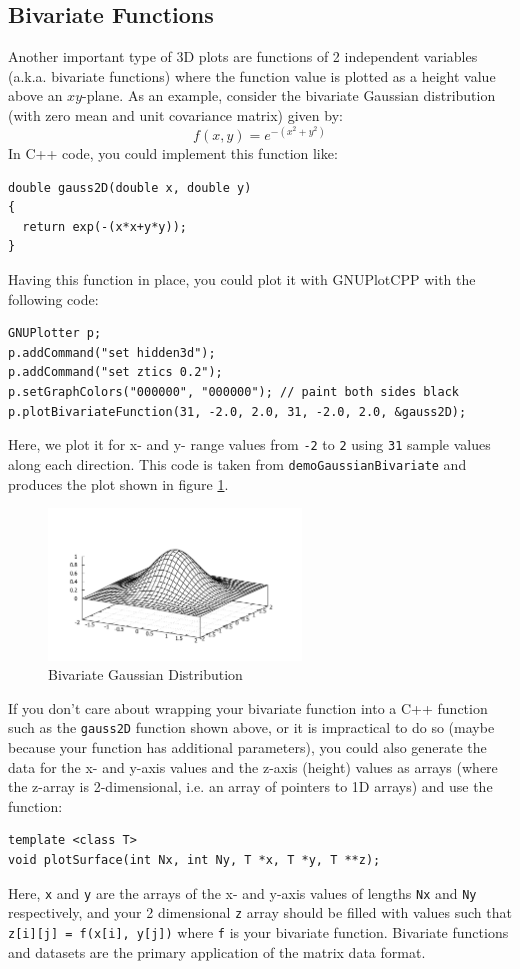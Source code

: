 \documentclass[11pt]{article}
\begin{document}
\subsection{Bivariate Functions}
Another important type of 3D plots are functions of 2 independent variables (a.k.a. bivariate functions) where the function value is plotted as a height value above an $xy$-plane. As an example, consider the bivariate Gaussian distribution (with zero mean and unit covariance matrix) given by:
\begin{equation}
	f(x,y) = e^{-(x^2+y^2)}
\end{equation}
In C++ code, you could implement this function like:
\begin{verbatim}
double gauss2D(double x, double y)
{
  return exp(-(x*x+y*y)); 
}
\end{verbatim}
Having this function in place, you could plot it with GNUPlotCPP with the following code:
\begin{verbatim}
GNUPlotter p;
p.addCommand("set hidden3d");
p.addCommand("set ztics 0.2");
p.setGraphColors("000000", "000000"); // paint both sides black
p.plotBivariateFunction(31, -2.0, 2.0, 31, -2.0, 2.0, &gauss2D);
\end{verbatim}
Here, we plot it for x- and y- range values from \texttt{-2} to \texttt{2} using \texttt{31} sample values along each direction. This code is taken from \texttt{demoGaussianBivariate} and produces the plot shown in figure \ref{fig:GaussianBivariate}.
\begin{figure}[h!]
	\centering
  	\includegraphics[width=0.60\textwidth]{Plots/GaussianBivariate.pdf}
	\caption{Bivariate Gaussian Distribution}
	\label{fig:GaussianBivariate}
\end{figure}
If you don't care about wrapping your bivariate function into a C++ function such as the \texttt{gauss2D} function shown above, or it is impractical to do so (maybe because your function has additional parameters), you could also generate the data for the x- and y-axis values and the z-axis (height) values as arrays (where the z-array is 2-dimensional, i.e. an array of pointers to 1D arrays) and use the function:
\begin{verbatim}
template <class T>
void plotSurface(int Nx, int Ny, T *x, T *y, T **z);
\end{verbatim}
Here, \texttt{x} and \texttt{y} are the arrays of the x- and y-axis values of lengths \texttt{Nx} and \texttt{Ny} respectively, and your 2 dimensional \texttt{z} array should be filled with values such that \texttt{z[i][j] = f(x[i], y[j])} where \texttt{f} is your bivariate function. Bivariate functions and datasets are the primary application of the matrix data format.
\end{document}
